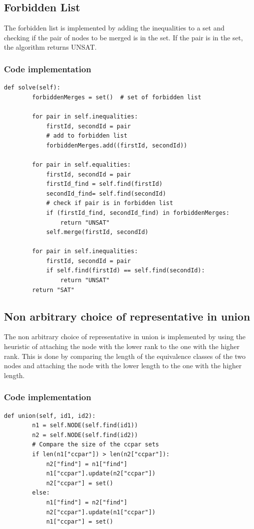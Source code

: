 \documentclass[11pt]{report}
\begin{document}
\subsection*{Forbidden List}
The forbidden list is implemented by adding the inequalities to a set and checking if the pair of nodes to be merged is in the set. If the pair is in the set, the algorithm returns UNSAT.
\subsubsection*{Code implementation}
\begin{lstlisting}[style=pythoncode]
    def solve(self):
        forbiddenMerges = set()  # set of forbidden list

        for pair in self.inequalities:
            firstId, secondId = pair
            # add to forbidden list
            forbiddenMerges.add((firstId, secondId)) 

        for pair in self.equalities:
            firstId, secondId = pair
            firstId_find = self.find(firstId) 
            secondId_find= self.find(secondId)
            # check if pair is in forbidden list
            if (firstId_find, secondId_find) in forbiddenMerges: 
                return "UNSAT"
            self.merge(firstId, secondId)

        for pair in self.inequalities:
            firstId, secondId = pair
            if self.find(firstId) == self.find(secondId):
                return "UNSAT"
        return "SAT"
\end{lstlisting}



\subsection*{Non arbitrary choice of representative in union} 
The non arbitrary choice of representative in union is implemented by using the heuristic of attaching the node with the lower rank to the one with the higher rank. This is done by comparing the length of the equivalence classes of the two nodes and attaching the node with the lower length to the one with the higher length.
\subsubsection*{Code implementation}
\begin{lstlisting}[style=pythoncode]
    def union(self, id1, id2):
        n1 = self.NODE(self.find(id1))
        n2 = self.NODE(self.find(id2))
        # Compare the size of the ccpar sets
        if len(n1["ccpar"]) > len(n2["ccpar"]): 
            n2["find"] = n1["find"]
            n1["ccpar"].update(n2["ccpar"])
            n2["ccpar"] = set()
        else:
            n1["find"] = n2["find"]
            n2["ccpar"].update(n1["ccpar"])
            n1["ccpar"] = set()

\end{lstlisting}
\end{document}
